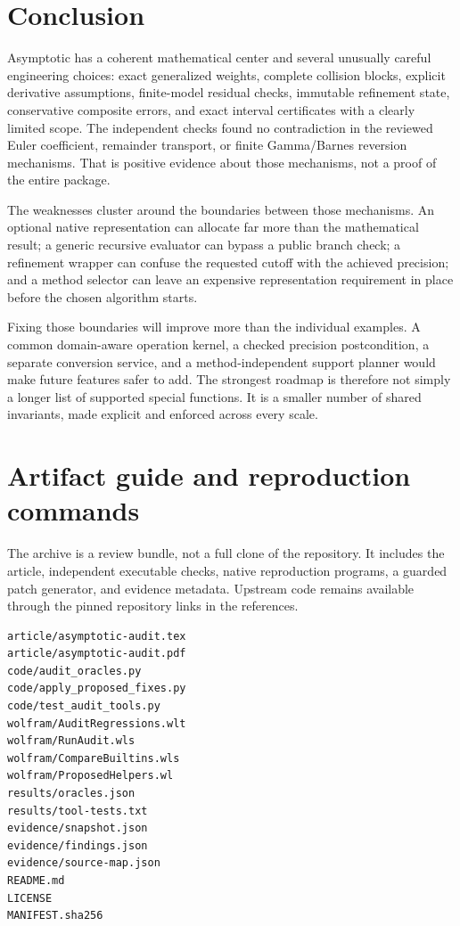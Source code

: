 \documentclass[11pt,a4paper]{article}
\theoremstyle{definition}
\begin{document}
\section{Conclusion}

Asymptotic has a coherent mathematical center and several unusually careful engineering choices: exact generalized weights, complete collision blocks, explicit derivative assumptions, finite-model residual checks, immutable refinement state, conservative composite errors, and exact interval certificates with a clearly limited scope. The independent checks found no contradiction in the reviewed Euler coefficient, remainder transport, or finite Gamma/Barnes reversion mechanisms. That is positive evidence about those mechanisms, not a proof of the entire package.\cite{core,incremental,transport,envelopes,certificates}

The weaknesses cluster around the boundaries between those mechanisms. An optional native representation can allocate far more than the mathematical result; a generic recursive evaluator can bypass a public branch check; a refinement wrapper can confuse the requested cutoff with the achieved precision; and a method selector can leave an expensive representation requirement in place before the chosen algorithm starts.

Fixing those boundaries will improve more than the individual examples. A common domain-aware operation kernel, a checked precision postcondition, a separate conversion service, and a method-independent support planner would make future features safer to add. The strongest roadmap is therefore not simply a longer list of supported special functions. It is a smaller number of shared invariants, made explicit and enforced across every scale.

\appendix
\section{Artifact guide and reproduction commands}
\label{app:artifacts}

The archive is a review bundle, not a full clone of the repository. It includes the article, independent executable checks, native reproduction programs, a guarded patch generator, and evidence metadata. Upstream code remains available through the pinned repository links in the references.

\begin{lstlisting}[language={}]
article/asymptotic-audit.tex
article/asymptotic-audit.pdf
code/audit_oracles.py
code/apply_proposed_fixes.py
code/test_audit_tools.py
wolfram/AuditRegressions.wlt
wolfram/RunAudit.wls
wolfram/CompareBuiltins.wls
wolfram/ProposedHelpers.wl
results/oracles.json
results/tool-tests.txt
evidence/snapshot.json
evidence/findings.json
evidence/source-map.json
README.md
LICENSE
MANIFEST.sha256
\end{lstlisting}
\end{document}
